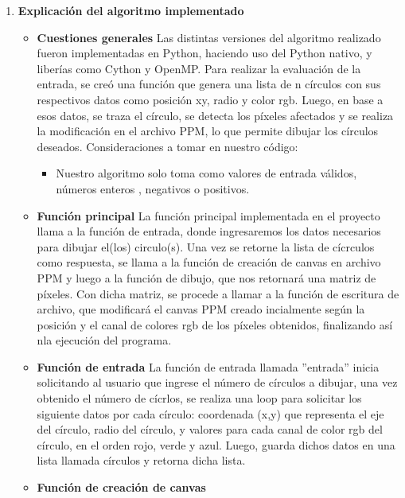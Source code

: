 \documentclass[12pt, letterpaper]{article}
\begin{document}
\vspace{10mm}
\begin{flushleft}
    \begin{enumerate}
        \item \textbf{Explicación del algoritmo implementado}
        \begin{itemize}
            \item \textbf{Cuestiones generales}
            Las distintas versiones del algoritmo realizado fueron implementadas en Python, haciendo uso del Python nativo, y liberías como Cython y OpenMP.
            Para realizar la evaluación de la entrada, se creó una función que genera una lista de n círculos con sus respectivos datos como posición xy, radio y color rgb. Luego, en base a esos datos, se traza el círculo, se detecta los píxeles afectados y se realiza la modificación en el archivo PPM, lo que permite dibujar los círculos deseados.
            Consideraciones a tomar en nuestro código:
        \begin{itemize}
            \item Nuestro algoritmo solo toma como valores de entrada válidos, números enteros , negativos o positivos.
        \end{itemize}
            \item \textbf{Función principal}
            La función principal implementada en el proyecto llama a la función de entrada, donde ingresaremos los datos necesarios para dibujar el(los) circulo(s). Una vez se retorne la lista de cícrculos como respuesta, se llama a la función de creación de canvas en archivo PPM y luego a la función de dibujo, que nos retornará una matriz de píxeles. Con dicha matriz, se procede a llamar a la función de escritura de archivo, que modificará el canvas PPM creado incialmente según la posición y el canal de colores rgb de los píxeles obtenidos, finalizando así nla ejecución del programa.
            \item \textbf{Función de entrada}
            La función de entrada llamada ''entrada'' inicia solicitando al usuario que ingrese el número de círculos a dibujar, una vez obtenido el número de cícrlos, se realiza una loop para solicitar los siguiente datos por cada círculo: coordenada (x,y) que representa el eje del círculo, radio del círculo, y valores para cada canal de color rgb del círculo, en el orden rojo, verde y azul. Luego, guarda dichos datos en una lista llamada círculos y retorna dicha lista.
            \item \textbf{Función de creación de canvas}

\end{itemize}
\end{enumerate}
\end{flushleft}
\end{document}
